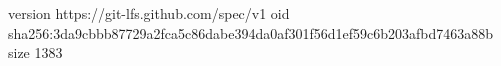 version https://git-lfs.github.com/spec/v1
oid sha256:3da9cbbb87729a2fca5c86dabe394da0af301f56d1ef59c6b203afbd7463a88b
size 1383
